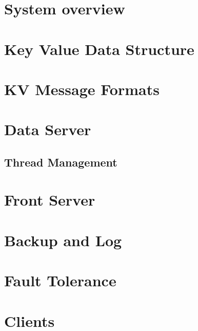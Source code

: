 \documentclass[12pt]{article} %
\begin{document}

\section{System overview}
\label{sec:Systemoverview}


\section{Key Value Data Structure}

\section{KV Message Formats}

\section{Data Server}
\label{sec:DataServer}
\subsection{Thread Management}
\label{sub:ThreadManagement}


\section{Front Server}
\label{sec:FrontServer}

\section{Backup and Log}
\label{sec:BackupLog}

\section{Fault Tolerance}
\label{sec:FaultTolerance}

\section{Clients}
\label{sec:Clients}
\end{document}
